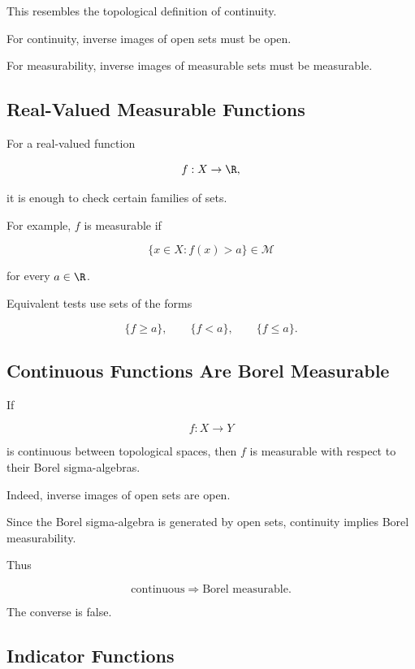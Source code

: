This resembles the topological definition of continuity.

For continuity, inverse images of open sets must be open.

For measurability, inverse images of measurable sets must be measurable.

\subsection{Real-Valued Measurable Functions}
\label{subsec:real-valued-measurable-functions}

For a real-valued function

\[
f:X\to\R,
\]

it is enough to check certain families of sets.

For example, \(f\) is measurable if

\[
\boxed{
\{x\in X:f(x)>a\}\in\mathcal{M}
}
\]

for every \(a\in\R\).

Equivalent tests use sets of the forms

\[
\{f\geq a\},
\qquad
\{f<a\},
\qquad
\{f\leq a\}.
\]

\subsection{Continuous Functions Are Borel Measurable}
\label{subsec:continuous-borel-measurable}

If

\[
f:X\to Y
\]

is continuous between topological spaces, then \(f\) is measurable with
respect to their Borel sigma-algebras.

Indeed, inverse images of open sets are open.

Since the Borel sigma-algebra is generated by open sets, continuity implies
Borel measurability.

Thus

\[
\boxed{
\text{continuous}
\Longrightarrow
\text{Borel measurable}.
}
\]

The converse is false.

\subsection{Indicator Functions}
\label{subsec:indicator-functions}

